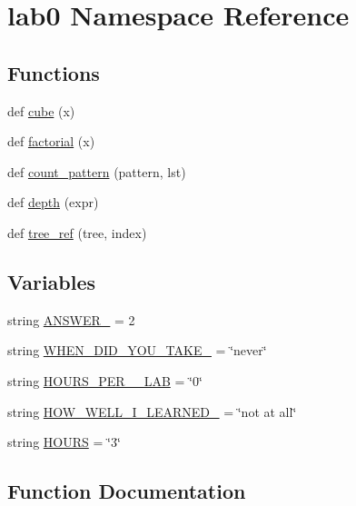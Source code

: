 \hypertarget{namespacelab0}{}\section{lab0 Namespace Reference}
\label{namespacelab0}
\subsection*{Functions}
\begin{DoxyCompactItemize}
\item 
def \hyperlink{namespacelab0_aaa50be4ae643ee3bfa84b87442f35f9c}{cube} (x)
\item 
def \hyperlink{namespacelab0_a93da934a72fe05e84fc01d06bed7e9e6}{factorial} (x)
\item 
def \hyperlink{namespacelab0_af363ef10c7ff7a4766b8fd786f094b6c}{count\+\_\+pattern} (pattern, lst)
\item 
def \hyperlink{namespacelab0_a538b15368b044d9f6dc024c4b4df937e}{depth} (expr)
\item 
def \hyperlink{namespacelab0_aaa51a498e36fbcbd371ce0fd0c937845}{tree\+\_\+ref} (tree, index)
\end{DoxyCompactItemize}
\subsection*{Variables}
\begin{DoxyCompactItemize}
\item 
string \hyperlink{namespacelab0_a90009da8915954e94172bca8529ac1ba}{A\+N\+S\+W\+E\+R\+\_} = \textquotesingle{}2\textquotesingle{}
\item 
string \hyperlink{namespacelab0_acd488bd06939b07429c2b9e072d99da3}{W\+H\+E\+N\+\_\+\+D\+I\+D\+\_\+\+Y\+O\+U\+\_\+\+T\+A\+K\+E\+\_} = \char`\"{}never\char`\"{}
\item 
string \hyperlink{namespacelab0_a580dd96a5375d581fec8ad05bf81e2b0}{H\+O\+U\+R\+S\+\_\+\+P\+E\+R\+\_\+\_\+\+L\+A\+B} = \char`\"{}0\char`\"{}
\item 
string \hyperlink{namespacelab0_a3749a0ef20b6222b5fd3c772a7cf3718}{H\+O\+W\+\_\+\+W\+E\+L\+L\+\_\+\+I\+\_\+\+L\+E\+A\+R\+N\+E\+D\+\_} = \char`\"{}not at all\char`\"{}
\item 
string \hyperlink{namespacelab0_a54acc2ffbf288940060f87b477c960c0}{H\+O\+U\+R\+S} = \char`\"{}3\char`\"{}
\end{DoxyCompactItemize}


\subsection{Function Documentation}
\hypertarget{namespacelab0_af363ef10c7ff7a4766b8fd786f094b6c}{}
